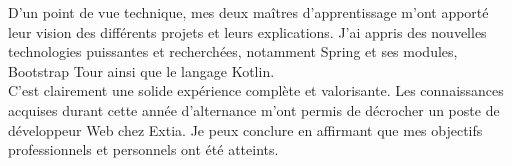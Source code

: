 \documentclass[12pt]{article}
\begin{document}
D'un point de vue technique, mes deux maîtres d’apprentissage m'ont apporté leur vision des différents projets et leurs explications. J'ai appris des nouvelles technologies puissantes et recherchées, notamment Spring et ses modules, Bootstrap Tour ainsi que le langage Kotlin. \\

C'est clairement une solide expérience complète et valorisante. Les connaissances acquises durant cette année d'alternance m'ont permis de décrocher un poste de développeur Web chez Extia. Je peux conclure en affirmant que mes objectifs professionnels et personnels ont été atteints. 
	

\newpage


\end{document}
